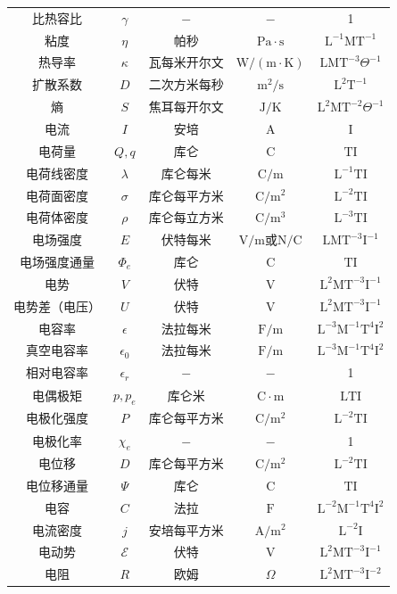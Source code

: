 \begin{center}
\begin{tabular}{ccccc}
        比热容比&$\gamma$&$\mathrm{-}$&$\mathrm{-}$&1\\
        粘度&$\eta$&帕秒&$\mathrm{Pa\cdot s}$&$\mathrm{L^{-1}MT^{-1}}$\\
        热导率&$\kappa$&瓦每米开尔文&$\mathrm{W/(m\cdot K)}$&$\mathrm{LMT^{-3}}\Theta^{-1}$\\
        扩散系数&$D$&二次方米每秒&$\mathrm{m^2/s}$&$\mathrm{L^2T^{-1}}$\\
        熵&$S$&焦耳每开尔文&$\mathrm{J/K}$&$\mathrm{L^2MT^{-2}}\Theta^{-1}$\\
        电流&$I$&安培&$\mathrm{A}$&$\mathrm{I}$\\
        电荷量&$Q,q$&库仑&$\mathrm{C}$&$\mathrm{TI}$\\
        电荷线密度&$\lambda$&库仑每米&$\mathrm{C/m}$&$\mathrm{L^{-1}TI}$\\
        电荷面密度&$\sigma$&库仑每平方米&$\mathrm{C/m^2}$&$\mathrm{L^{-2}TI}$\\
        电荷体密度&$\rho$&库仑每立方米&$\mathrm{C/m^3}$&$\mathrm{L^{-3}TI}$\\
        电场强度&$E$&伏特每米&$\mathrm{V/m\text{或}N/C}$&$\mathrm{LMT^{-3}I^{-1}}$\\
        电场强度通量&$\Phi_e$&库仑&$\mathrm{C}$&$\mathrm{TI}$\\
        电势&$V$&伏特&$\mathrm{V}$&$\mathrm{L^2MT^{-3}I^{-1}}$\\
        电势差（电压）&$U$&伏特&$\mathrm{V}$&$\mathrm{L^2MT^{-3}I^{-1}}$\\
        电容率&$\epsilon$&法拉每米&$\mathrm{F/m}$&$\mathrm{L^{-3}M^{-1}T^4I^2}$\\

        真空电容率&$\epsilon_0$&法拉每米&$\mathrm{F/m}$&$\mathrm{L^{-3}M^{-1}T^4I^2}$\\
        相对电容率&$\epsilon_r$&$\mathrm{-}$&$\mathrm{-}$&1\\
        电偶极矩&$p,p_e$&库仑米&$\mathrm{C\cdot m}$&$\mathrm{LTI}$\\
        电极化强度&$P$&库仑每平方米&$\mathrm{C/m^2}$&$\mathrm{L^{-2}TI}$\\
        电极化率&$\chi_e$&$\mathrm{-}$&$\mathrm{-}$&1\\
        电位移&$D$&库仑每平方米&$\mathrm{C/m^2}$&$\mathrm{L^{-2}TI}$\\
        电位移通量&$\Psi$&库仑&$\mathrm{C}$&$\mathrm{TI}$\\
        电容&$C$&法拉&$\mathrm{F}$&$\mathrm{L^{-2}M^{-1}T^{4}I^2}$\\
        电流密度&$j$&安培每平方米&$\mathrm{A/m^2}$&$\mathrm{L^{-2}I}$\\
        电动势&$\mathscr{E}$&伏特&$\mathrm{V}$&$\mathrm{L^2MT^{-3}I^{-1}}$\\
        电阻&$R$&欧姆&$\Omega$&$\mathrm{L^2MT^{-3}I^{-2}}$\\
        

\end{tabular}
\end{center}
